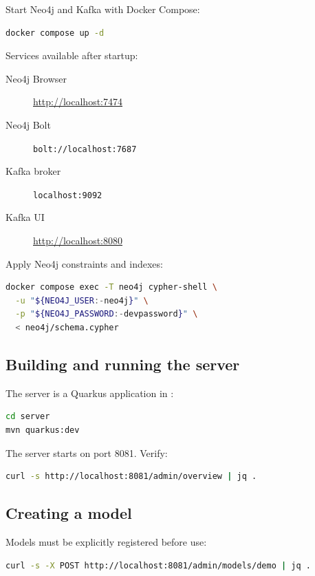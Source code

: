 Start Neo4j and Kafka with Docker Compose:

\begin{lstlisting}[language=bash,caption={Start containers}]
docker compose up -d
\end{lstlisting}

Services available after startup:

\begin{description}
\item[Neo4j Browser] \url{http://localhost:7474}
\item[Neo4j Bolt] \texttt{bolt://localhost:7687}
\item[Kafka broker] \texttt{localhost:9092}
\item[Kafka UI] \url{http://localhost:8080}
\end{description}

Apply Neo4j constraints and indexes:

\begin{lstlisting}[language=bash,caption={Apply schema}]
docker compose exec -T neo4j cypher-shell \
  -u "${NEO4J_USER:-neo4j}" \
  -p "${NEO4J_PASSWORD:-devpassword}" \
  < neo4j/schema.cypher
\end{lstlisting}

\subsection{Building and running the server}

The server is a Quarkus application in :

\begin{lstlisting}[language=bash,caption={Build and run server}]
cd server
mvn quarkus:dev
\end{lstlisting}

The server starts on port 8081. Verify:

\begin{lstlisting}[language=bash,caption={Health check}]
curl -s http://localhost:8081/admin/overview | jq .
\end{lstlisting}

\subsection{Creating a model}

Models must be explicitly registered before use:

\begin{lstlisting}[language=bash,caption={Register model}]
curl -s -X POST http://localhost:8081/admin/models/demo | jq .
\end{lstlisting}

